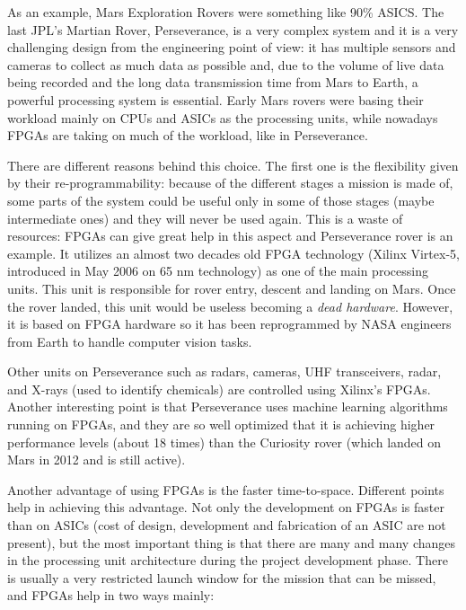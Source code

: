 As an example, Mars Exploration Rovers were something like 90\% ASICS. The last JPL's Martian Rover, Perseverance, is a very complex system and it is a very challenging design from the engineering point of view: it has multiple sensors and cameras to collect as much data as possible and, due to the volume of live data being recorded and the long data transmission time from Mars to Earth, a powerful processing system is essential. Early Mars rovers were basing their workload mainly on CPUs and ASICs as the processing units, while nowadays FPGAs are taking on much of the workload, like in Perseverance.\bigskip

There are different reasons behind this choice. The first one is the flexibility given by their re-programmability: because of the different stages a mission is made of, some parts of the system could be useful only in some of those stages (maybe intermediate ones) and they will never be used again. This is a waste of resources: FPGAs can give great help in this aspect and Perseverance rover is an example. It utilizes an almost two decades old FPGA technology (Xilinx Virtex-5, introduced in May 2006 on 65 nm technology) as one of the main processing units. This unit is responsible for rover entry, descent and landing on Mars. Once the rover landed, this unit would be useless becoming a \textit{dead hardware}. However, it is based on FPGA hardware so it has been reprogrammed by NASA engineers from Earth to handle computer vision tasks.\bigskip

Other units on Perseverance such as radars, cameras, UHF transceivers, radar, and X-rays (used to identify chemicals) are controlled using Xilinx's FPGAs. Another interesting point is that Perseverance uses machine learning algorithms running on FPGAs, and they are so well optimized that it is achieving higher performance levels (about 18 times) than the Curiosity rover (which landed on Mars in 2012 and is still active). \bigskip

Another advantage of using FPGAs is the faster time-to-space. Different points help in achieving this advantage. Not only the development on FPGAs is faster than on ASICs (cost of design, development and fabrication of an ASIC are not present), but the most important thing is that there are many and many changes in the processing unit architecture during the project development phase. There is usually a very restricted launch window for the mission that can be missed, and FPGAs help in two ways mainly:

